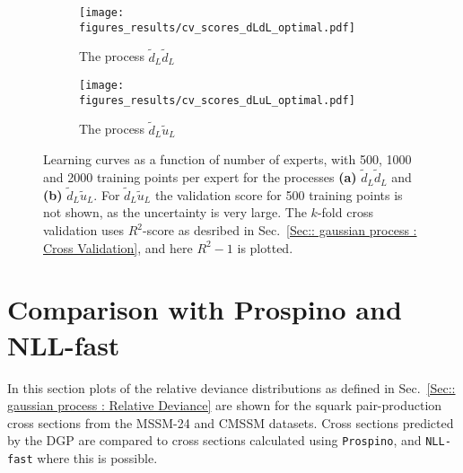 \documentclass[twoside,english]{uiofysmaster}
\begin{document}
\begin{figure}
    \centering
    \begin{subfigure}[b]{0.7\textwidth}
        \texttt{[image: figures\_results/cv\_scores\_dLdL\_optimal.pdf]}
        \caption{The process $\tilde{d}_L \tilde{d}_L$}
        \label{Fig:: results : Learning curves dLdL}
    \end{subfigure}
    \begin{subfigure}[b]{0.7\textwidth}
        \texttt{[image: figures\_results/cv\_scores\_dLuL\_optimal.pdf]}
        \caption{The process $\tilde{d}_L \tilde{u}_L$}
        \label{Fig :: results : Learning curves dLuL}
    \end{subfigure}
    \caption{Learning curves as a function of number of experts, with 500, 1000 and 2000 training points per expert for the processes \textbf{(a)} $\tilde{d}_L \tilde{d}_L$ and \textbf{(b)} $\tilde{d}_L\tilde{u}_L$. For $\tilde{d}_L \tilde{u}_L$ the validation score for 500 training points is not shown, as the uncertainty is very large. The $k$-fold cross validation uses $R^2$-score as desribed in Sec.~\ref{Sec:: gaussian process : Cross Validation}, and here $R^2-1$ is plotted.}
\label{Fig:: results : Learning curves}
\end{figure}


\section{Comparison with Prospino and NLL-fast}

In this section plots of the relative deviance distributions as defined in Sec.~\ref{Sec:: gaussian process : Relative Deviance} are shown for the squark pair-production cross sections from the MSSM-24 and CMSSM datasets. Cross sections predicted by the DGP are compared to cross sections calculated using \verb|Prospino|, and \verb|NLL-fast| where this is possible.
\end{document}
